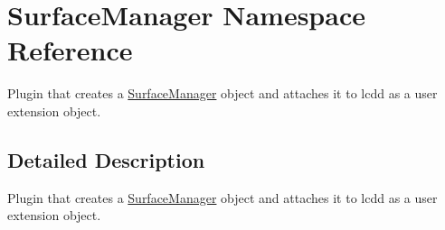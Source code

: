 \hypertarget{namespace_surface_manager}{}\section{Surface\+Manager Namespace Reference}
\label{namespace_surface_manager}


Plugin that creates a \hyperlink{namespace_surface_manager}{Surface\+Manager} object and attaches it to lcdd as a user extension object.  




\subsection{Detailed Description}
Plugin that creates a \hyperlink{namespace_surface_manager}{Surface\+Manager} object and attaches it to lcdd as a user extension object. 